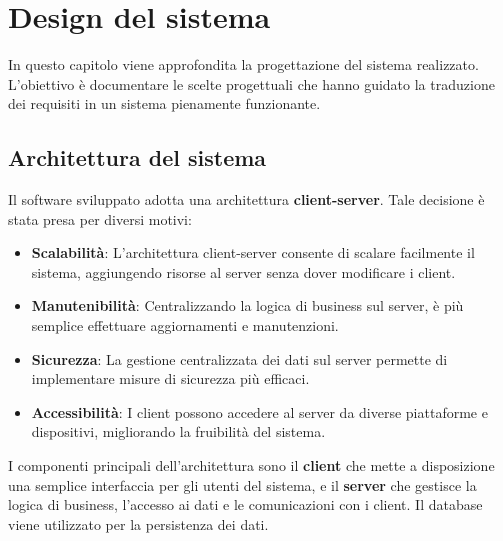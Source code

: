 \section{Design del sistema}
In questo capitolo viene approfondita la progettazione del sistema realizzato.
L'obiettivo è documentare le scelte progettuali che hanno guidato la traduzione dei requisiti
in un sistema pienamente funzionante.

\subsection{Architettura del sistema}
Il software sviluppato adotta una architettura \textbf{client-server}. Tale decisione è stata presa per
diversi motivi:
\begin{itemize}
    \item \textbf{Scalabilità}: L'architettura client-server consente di scalare facilmente il sistema, aggiungendo risorse al server
    senza dover modificare i client.
    \item \textbf{Manutenibilità}: Centralizzando la logica di business sul server, è più semplice effettuare aggiornamenti e manutenzioni.
    \item \textbf{Sicurezza}: La gestione centralizzata dei dati sul server permette di implementare misure di sicurezza più efficaci.
    \item \textbf{Accessibilità}: I client possono accedere al server da diverse piattaforme e dispositivi, migliorando la fruibilità del sistema.
\end{itemize}
I componenti principali dell'architettura sono il \textbf{client} che mette a disposizione una semplice interfaccia per gli utenti
del sistema, e il \textbf{server} che gestisce la logica di business, l'accesso ai dati e le comunicazioni con i client. Il database
viene utilizzato per la persistenza dei dati.

